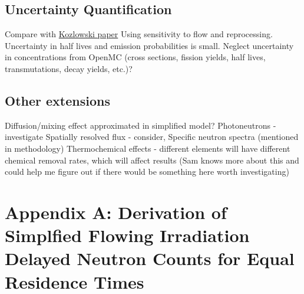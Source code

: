 \documentclass[edeposit,fullpage,hidelinks]{uiucthesis2018}
\begin{document}
\section{Uncertainty Quantification}

Compare with \href{https://www.researchgate.net/publication/329403358_A_new_framework_for_sampling-based_uncertainty_quantification_of_the_six-group_reactor_kinetic_parameters}{Kozlowski paper}
Using sensitivity to flow and reprocessing.
Uncertainty in half lives and emission probabilities is small.
Neglect uncertainty in concentrations from OpenMC (cross sections, fission yields, half lives, transmutations, decay yields, etc.)?

\section{Other extensions}
Diffusion/mixing effect approximated in simplified model?
Photoneutrons - investigate
Spatially resolved flux - consider, Specific neutron spectra (mentioned in methodology)
Thermochemical effects - different elements will have different chemical removal rates, which will affect results (Sam knows more about this and could help me figure out if there would be something here worth investigating)

\appendix
\chapter{Appendix A: Derivation of Simplfied Flowing Irradiation Delayed Neutron Counts for Equal Residence Times}




%

%

\backmatter



\end{document}
